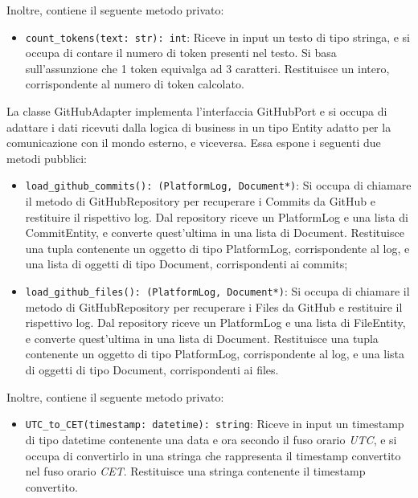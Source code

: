 Inoltre, contiene il seguente metodo privato:
\begin{itemize}
    \item \texttt{count\_tokens(text: str): int}: Riceve in input un testo di tipo stringa, e si occupa di contare il numero di token presenti nel testo. Si basa sull'assunzione che 1 token equivalga ad 3 caratteri. Restituisce un intero, corrispondente al numero di token calcolato.
\end{itemize}

\label{sec:github_adapter}
La classe GitHubAdapter implementa l'interfaccia GitHubPort e si occupa di adattare i dati ricevuti dalla logica di business in un tipo Entity adatto per la comunicazione con il mondo esterno, e viceversa. Essa espone i seguenti due metodi pubblici:
\begin{itemize}
    \item \texttt{load\_github\_commits(): (PlatformLog, Document*)}: Si occupa di chiamare il metodo di GitHubRepository per recuperare i Commits da GitHub e restituire il rispettivo log. Dal repository riceve un PlatformLog e una lista di CommitEntity, e converte quest'ultima in una lista di Document. Restituisce una tupla contenente un oggetto di tipo PlatformLog, corrispondente al log, e una lista di oggetti di tipo Document, corrispondenti ai commits;
    \item \texttt{load\_github\_files(): (PlatformLog, Document*)}: Si occupa di chiamare il metodo di GitHubRepository per recuperare i Files da GitHub e restituire il rispettivo log. Dal repository riceve un PlatformLog e una lista di FileEntity, e converte quest'ultima in una lista di Document. Restituisce una tupla contenente un oggetto di tipo PlatformLog, corrispondente al log, e una lista di oggetti di tipo Document, corrispondenti ai files.
\end{itemize}
Inoltre, contiene il seguente metodo privato:
\begin{itemize}
    \item \texttt{UTC\_to\_CET(timestamp: datetime): string}: Riceve in input un timestamp di tipo datetime contenente una data e ora secondo il fuso orario \emph{UTC}, e si occupa di convertirlo in una stringa che rappresenta il timestamp convertito nel fuso orario \emph{CET}. Restituisce una stringa contenente il timestamp convertito.
\end{itemize}

